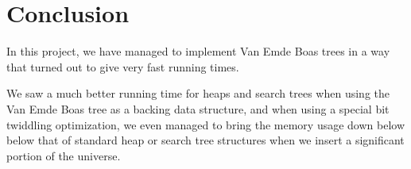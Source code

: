 \section{Conclusion}

In this project, we have managed to implement Van Emde Boas trees in a way that turned out to give very fast running times.

We saw a much better running time for heaps and search trees when using the Van Emde Boas tree as a backing data structure, and when using a special bit twiddling optimization, we even managed to bring the memory usage down below below that of standard heap or search tree structures when we insert a significant portion of the universe.